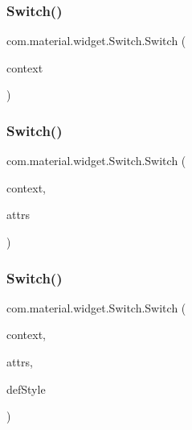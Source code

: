 \subsubsection{\texorpdfstring{Switch()}{Switch()}\hspace{0.1cm}{\footnotesize\ttfamily [1/3]}}
{\footnotesize\ttfamily com.\+material.\+widget.\+Switch.\+Switch (\begin{DoxyParamCaption}\item[{Context}]{context }\end{DoxyParamCaption})}

\mbox{\label{classcom_1_1material_1_1widget_1_1_switch_a153eb541d86bbdfbcf4788e25446fd5d}} 
\subsubsection{\texorpdfstring{Switch()}{Switch()}\hspace{0.1cm}{\footnotesize\ttfamily [2/3]}}
{\footnotesize\ttfamily com.\+material.\+widget.\+Switch.\+Switch (\begin{DoxyParamCaption}\item[{Context}]{context,  }\item[{Attribute\+Set}]{attrs }\end{DoxyParamCaption})}

\mbox{\label{classcom_1_1material_1_1widget_1_1_switch_aee05021beb02dfa4c103cdd3f1d6dfed}} 
\subsubsection{\texorpdfstring{Switch()}{Switch()}\hspace{0.1cm}{\footnotesize\ttfamily [3/3]}}
{\footnotesize\ttfamily com.\+material.\+widget.\+Switch.\+Switch (\begin{DoxyParamCaption}\item[{Context}]{context,  }\item[{Attribute\+Set}]{attrs,  }\item[{int}]{def\+Style }\end{DoxyParamCaption})}



